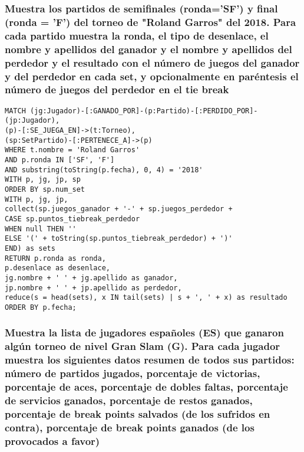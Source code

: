 \subsubsection{Muestra los partidos de semiﬁnales (ronda='SF') y ﬁnal (ronda = 'F') del torneo de "Roland Garros" del 2018. Para cada partido muestra la ronda, el tipo de desenlace, el nombre y apellidos del ganador y el nombre y apellidos del perdedor y el resultado con el número de juegos del ganador y del perdedor en cada set, y opcionalmente en paréntesis el número de juegos del perdedor en el tie break}

\begin{verbatim}
MATCH (jg:Jugador)-[:GANADO_POR]-(p:Partido)-[:PERDIDO_POR]-(jp:Jugador),
(p)-[:SE_JUEGA_EN]->(t:Torneo),
(sp:SetPartido)-[:PERTENECE_A]->(p)
WHERE t.nombre = 'Roland Garros'
AND p.ronda IN ['SF', 'F']
AND substring(toString(p.fecha), 0, 4) = '2018'
WITH p, jg, jp, sp
ORDER BY sp.num_set
WITH p, jg, jp,
collect(sp.juegos_ganador + '-' + sp.juegos_perdedor +
CASE sp.puntos_tiebreak_perdedor
WHEN null THEN ''
ELSE '(' + toString(sp.puntos_tiebreak_perdedor) + ')'
END) as sets
RETURN p.ronda as ronda,
p.desenlace as desenlace,
jg.nombre + ' ' + jg.apellido as ganador,
jp.nombre + ' ' + jp.apellido as perdedor,
reduce(s = head(sets), x IN tail(sets) | s + ', ' + x) as resultado
ORDER BY p.fecha;
\end{verbatim}





\subsubsection{Muestra la lista de jugadores españoles (ES) que ganaron algún torneo de nivel Gran Slam (G). Para cada jugador muestra los siguientes datos resumen de todos sus partidos: número de partidos jugados, porcentaje de victorias, porcentaje de aces, porcentaje de dobles faltas, porcentaje de servicios ganados, porcentaje de restos ganados, porcentaje de break points salvados (de los sufridos en contra), porcentaje de break points ganados (de los provocados a favor)}

